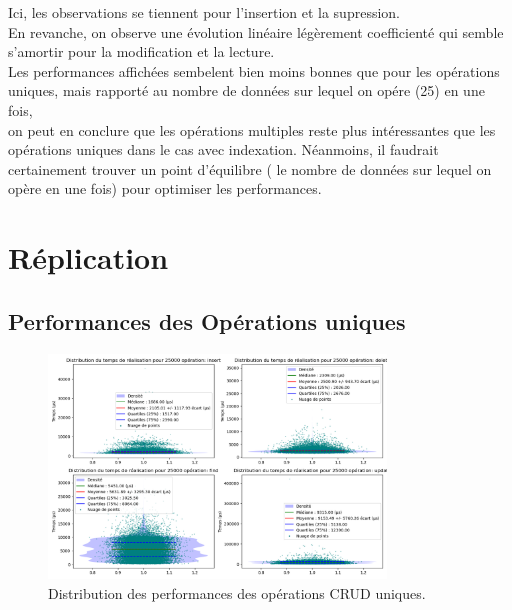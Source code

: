 \documentclass[12pt,a4paper]{report}
\begin{document}
                \begin{card}
                    Ici, les observations se tiennent pour l'insertion et la supression. \\
                    En revanche, on observe une évolution linéaire légèrement coefficienté qui semble s'amortir pour la modification et la lecture. \\
                    Les performances affichées sembelent bien moins bonnes que pour les opérations uniques, mais rapporté au nombre de données sur lequel on opére (25) en une fois, \\
                    on peut en conclure que les opérations multiples reste plus intéressantes que les opérations uniques dans le cas avec indexation.
                    Néanmoins, il  faudrait certainement trouver un point d'équilibre ( le nombre de données sur lequel on opère en une fois) pour optimiser les performances. \\
                \end{card}


\section{Réplication}

    \subsection{Performances des Opérations uniques}

        \begin{figure}[H]
            \centering
            \includegraphics[width=0.8\textwidth]{../plots/MongoDB/replica_set/global_test_one.png}
            \caption{Distribution des performances des opérations CRUD uniques.}
            \label{fig:mongo_replica_global_one}
        \end{figure}
\end{document}
